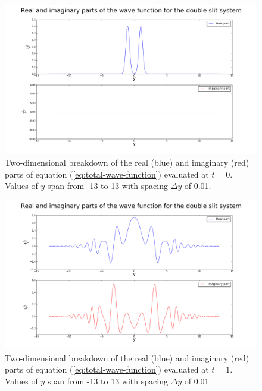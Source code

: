 \documentclass[10pt, reqno]{article}
\begin{document}
    \begin{figure}[!ht]
      \centerline{\includegraphics[scale=.3]{./imgs/double-slit-real-imaginary-parts-t0.png}}
      \caption{
        Two-dimensional breakdown of the real (blue) and imaginary (red) parts of equation (\ref{eq:total-wave-function}) evaluated at $t=0$.
        Values of $y$ span from -13 to 13 with spacing $\Delta y$ of 0.01.
      }
      \label{fig:2d0}
    \end{figure}
    \begin{figure}[!ht]
      \centerline{\includegraphics[scale=.3]{./imgs/double-slit-real-imaginary-parts-t1.png}}
      \caption{
        Two-dimensional breakdown of the real (blue) and imaginary (red) parts of equation (\ref{eq:total-wave-function}) evaluated at $t=1$.
        Values of $y$ span from -13 to 13 with spacing $\Delta y$ of 0.01.
      }
      \label{fig:2d1}
    \end{figure}
\end{document}
